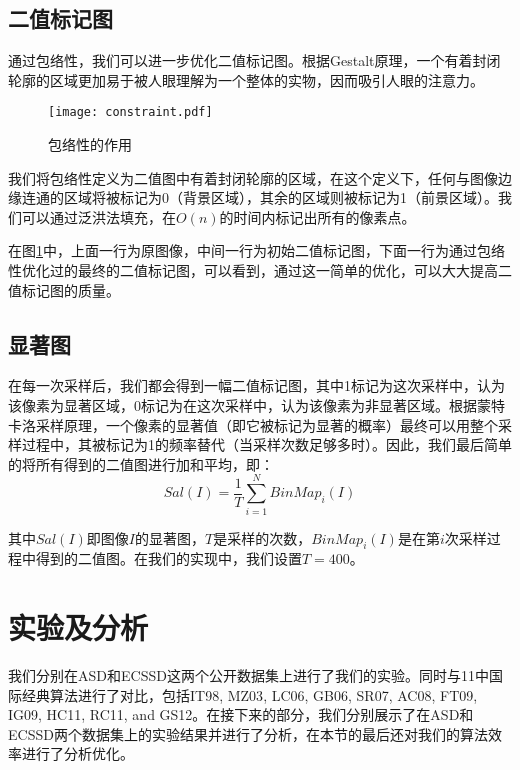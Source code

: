 \subsection{二值标记图}
通过包络性，我们可以进一步优化二值标记图。根据Gestalt原理\cite{beardslee1958readings}，一个有着封闭轮廓的区域更加易于被人眼理解为一个整体的实物，因而吸引人眼的注意力。

\begin{figure}
\centering
\texttt{[image: constraint.pdf]}
\caption{包络性的作用} \label{fig:constraint}
\end{figure}

我们将包络性定义为二值图中有着封闭轮廓的区域，在这个定义下，任何与图像边缘连通的区域将被标记为0（背景区域），其余的区域则被标记为1（前景区域）。我们可以通过泛洪法填充，在$O(n)$的时间内标记出所有的像素点。

在图\ref{fig:constraint}中，上面一行为原图像，中间一行为初始二值标记图，下面一行为通过包络性优化过的最终的二值标记图，可以看到，通过这一简单的优化，可以大大提高二值标记图的质量。

\subsection{显著图}
在每一次采样后，我们都会得到一幅二值标记图，其中1标记为这次采样中，认为该像素为显著区域，0标记为在这次采样中，认为该像素为非显著区域。根据蒙特卡洛采样原理，一个像素的显著值（即它被标记为显著的概率）最终可以用整个采样过程中，其被标记为1的频率替代（当采样次数足够多时）。因此，我们最后简单的将所有得到的二值图进行加和平均，即：
\begin{equation}
Sal(I) = \frac{1}{T}\sum_{i=1}^{N}BinMap_i(I)
\end{equation}

其中$Sal(I)$即图像$I$的显著图，$T$是采样的次数，$BinMap_i(I)$是在第$i$次采样过程中得到的二值图。在我们的实现中，我们设置$T=400$。

\section{实验及分析}
我们分别在ASD\cite{achanta2009frequency}和ECSSD\cite{yan2013hierarchical}这两个公开数据集上进行了我们的实验。同时与11中国际经典算法进行了对比，包括IT98\cite{itti1998model}, MZ03\cite{ma2003contrast}, LC06\cite{zhai2006visual}, GB06\cite{harel2006graph}, SR07\cite{hou2007saliency},  AC08\cite{achanta2008salient}, FT09\cite{achanta2009frequency},  IG09\cite{achanta2009frequency}, HC11\cite{cheng2011global}, RC11\cite{cheng2011global}, and GS12\cite{wei2012geodesic}。在接下来的部分，我们分别展示了在ASD和ECSSD两个数据集上的实验结果并进行了分析，在本节的最后还对我们的算法效率进行了分析优化。

